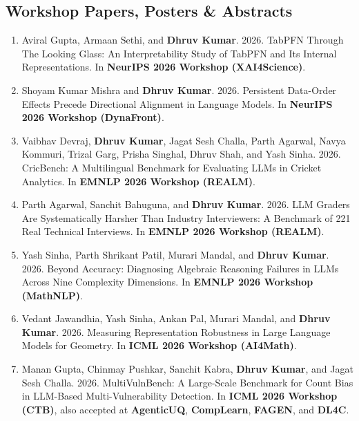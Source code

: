 \documentclass[10pt, a4paper]{article}
\begin{document}
\subsection*{Workshop Papers, Posters \& Abstracts}
\begin{enumerate}[label=\textbf{W\arabic*.}, leftmargin=2.8em, itemsep=0.3em]

\item Aviral Gupta, Armaan Sethi, and \textbf{Dhruv Kumar}. 2026. TabPFN Through The Looking Glass: An Interpretability Study of TabPFN and Its Internal Representations. In \textbf{NeurIPS 2026 Workshop (XAI4Science)}.

\item Shoyam Kumar Mishra and \textbf{Dhruv Kumar}. 2026. Persistent Data-Order Effects Precede Directional Alignment in Language Models. In \textbf{NeurIPS 2026 Workshop (DynaFront)}.

\item Vaibhav Devraj, \textbf{Dhruv Kumar}, Jagat Sesh Challa, Parth Agarwal, Navya Kommuri, Trizal Garg, Prisha Singhal, Dhruv Shah, and Yash Sinha. 2026. CricBench: A Multilingual Benchmark for Evaluating LLMs in Cricket Analytics. In \textbf{EMNLP 2026 Workshop (REALM)}.

\item Parth Agarwal, Sanchit Bahuguna, and \textbf{Dhruv Kumar}. 2026. LLM Graders Are Systematically Harsher Than Industry Interviewers: A Benchmark of 221 Real Technical Interviews. In \textbf{EMNLP 2026 Workshop (REALM)}.

\item Yash Sinha, Parth Shrikant Patil, Murari Mandal, and \textbf{Dhruv Kumar}. 2026. Beyond Accuracy: Diagnosing Algebraic Reasoning Failures in LLMs Across Nine Complexity Dimensions. In \textbf{EMNLP 2026 Workshop (MathNLP)}.

\item Vedant Jawandhia, Yash Sinha, Ankan Pal, Murari Mandal, and \textbf{Dhruv Kumar}. 2026. Measuring Representation Robustness in Large Language Models for Geometry. In \textbf{ICML 2026 Workshop (AI4Math)}.

\item Manan Gupta, Chinmay Pushkar, Sanchit Kabra, \textbf{Dhruv Kumar}, and Jagat Sesh Challa. 2026. MultiVulnBench: A Large-Scale Benchmark for Count Bias in LLM-Based Multi-Vulnerability Detection. In \textbf{ICML 2026 Workshop (CTB)}, also accepted at \textbf{AgenticUQ}, \textbf{CompLearn}, \textbf{FAGEN}, and \textbf{DL4C}.


\end{enumerate}
\end{document}
